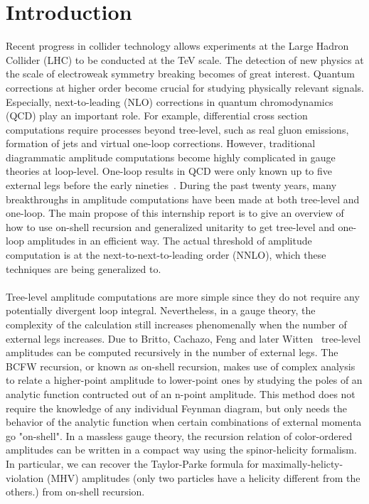 \section{Introduction}
Recent progress in collider technology allows experiments at the Large Hadron Collider (LHC) to be conducted at the TeV scale.
The detection of new physics at the scale of electroweak symmetry breaking becomes of great interest. 
Quantum corrections at higher order become crucial for studying physically relevant signals. 
Especially, next-to-leading (NLO) corrections in quantum chromodynamics (QCD) play an important role. 
For example, differential cross section computations require processes beyond tree-level, such as real gluon emissions, formation of jets and virtual one-loop corrections.
However, traditional diagrammatic amplitude computations become highly complicated in gauge theories at loop-level.
One-loop results in QCD were only known up to five external legs before the early nineties~\cite{Bern:1994zx}. 
During the past twenty years, many breakthroughs in amplitude computations have been made at both tree-level and one-loop.
The main propose of this internship report is to give an overview of how to use on-shell recursion and generalized unitarity to get tree-level and one-loop amplitudes in an efficient way. 
The actual threshold of amplitude computation is at the next-to-next-to-leading order (NNLO), which these techniques are being generalized to.
\\\\
Tree-level amplitude computations are more simple since they do not require any potentially divergent loop integral.
Nevertheless, in a gauge theory, the complexity of the calculation still increases phenomenally when the number of external legs increases.
Due to Britto, Cachazo, Feng and later Witten~\cite{BRITTO2005499, PhysRevLett.94.181602}
tree-level amplitudes can be computed recursively in the number of external legs.
The BCFW recursion, or known as on-shell recursion, makes use of complex analysis to relate a higher-point amplitude to lower-point ones by studying the poles of an analytic function contructed out of an n-point amplitude.
This method does not require the knowledge of any individual Feynman diagram, but only needs the behavior of the analytic function when certain combinations of external momenta go "on-shell". 
In a massless gauge theory, the recursion relation of color-ordered amplitudes can be written in a compact way using the spinor-helicity formalism.
In particular, we can recover the Taylor-Parke formula for maximally-helicty-violation (MHV) amplitudes (\ie only two particles have a helicity different from the others.) from on-shell recursion.
